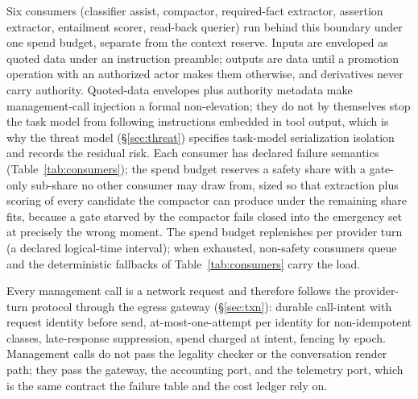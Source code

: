 \documentclass[11pt]{article}
\begin{document}
Six consumers (classifier assist, compactor, required-fact extractor, assertion extractor, entailment scorer, read-back querier) run behind this boundary under one spend budget, separate from the context reserve. Inputs are enveloped as quoted data under an instruction preamble; outputs are data until a promotion operation with an authorized actor makes them otherwise, and derivatives never carry authority. Quoted-data envelopes plus authority metadata make management-call injection a formal non-elevation; they do not by themselves stop the task model from following instructions embedded in tool output, which is why the threat model (\S\ref{sec:threat}) specifies task-model serialization isolation and records the residual risk. Each consumer has declared failure semantics (Table~\ref{tab:consumers}); the spend budget reserves a safety share with a gate-only sub-share no other consumer may draw from, sized so that extraction plus scoring of every candidate the compactor can produce under the remaining share fits, because a gate starved by the compactor fails closed into the emergency set at precisely the wrong moment. The spend budget replenishes per provider turn (a declared logical-time interval); when exhausted, non-safety consumers queue and the deterministic fallbacks of Table~\ref{tab:consumers} carry the load.

Every management call is a network request and therefore follows the provider-turn protocol through the egress gateway (\S\ref{sec:txn}): durable call-intent with request identity before send, at-most-one-attempt per identity for non-idempotent classes, late-response suppression, spend charged at intent, fencing by epoch. Management calls do not pass the legality checker or the conversation render path; they pass the gateway, the accounting port, and the telemetry port, which is the same contract the failure table and the cost ledger rely on.
\end{document}

